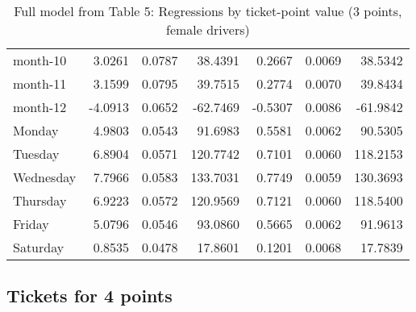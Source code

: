 \documentclass[10pt]{article}
\begin{document}
\begin{table}[ht]
\begin{tabular}{lrrrrrr}
  month-10 & 3.0261 & 0.0787 & 38.4391 & 0.2667 & 0.0069 & 38.5342 \\ 
  month-11 & 3.1599 & 0.0795 & 39.7515 & 0.2774 & 0.0070 & 39.8434 \\ 
  month-12 & -4.0913 & 0.0652 & -62.7469 & -0.5307 & 0.0086 & -61.9842 \\ 
  Monday & 4.9803 & 0.0543 & 91.6983 & 0.5581 & 0.0062 & 90.5305 \\ 
  Tuesday & 6.8904 & 0.0571 & 120.7742 & 0.7101 & 0.0060 & 118.2153 \\ 
  Wednesday & 7.7966 & 0.0583 & 133.7031 & 0.7749 & 0.0059 & 130.3693 \\ 
  Thursday & 6.9223 & 0.0572 & 120.9569 & 0.7121 & 0.0060 & 118.5400 \\ 
  Friday & 5.0796 & 0.0546 & 93.0860 & 0.5665 & 0.0062 & 91.9613 \\ 
  Saturday & 0.8535 & 0.0478 & 17.8601 & 0.1201 & 0.0068 & 17.7839 \\ 
   \hline
\end{tabular}
\caption{Full model from Table 5: Regressions by ticket-point value (3 points, female drivers)} 
\label{tab_5_3_pts_no_age_F}
\end{table}


\clearpage
\pagebreak




\subsection{Tickets for 4 points}



\end{document}
